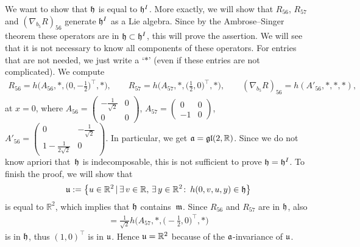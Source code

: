\documentclass[pdftex]{sigma}
\numberwithin{equation}{section}
\newcommand\fh{{\frak h}}
\newcommand\fm{{\frak m}}
\newcommand\fa{{\frak a}}
\newcommand\fu{{\frak u}}
\newcommand{\fgl}{\mathop{{\frak g \frak l}}}
\newcommand\RR{{\mathbb R}}
\begin{document}
We want to show that $\fh$ is equal to $\fh^I$. More exactly, we will show that $R_{56}$, $R_{57}$ and $(\nabla _{b_5}R)_{56}$ generate $\fh^I$ as a Lie algebra. Since by the Ambrose--Singer theorem these operators are in $\fh\subset \fh^I$, this will prove the assertion. We will see that it is not necessary to know all components of these operators. For entries that are not needed, we just write a `$*$' (even if these entries are not complicated). We compute
\begin{gather*}
R_{56}= h\big(A_{56},*,\big( 0,-\tfrac 12\big)^\top\!,* \big), \qquad\!\!
R_{57}= h\big(A_{57},*,\big( \tfrac12,0)^\top\!,* \big) , \qquad\!\!
(\nabla _{b_5}R)_{56}= h(A'_{56},*,*,* ),
\end{gather*}
at $x=0$, where $ A_{56}=\left( \begin{smallmatrix} -\frac1{\sqrt 2}&0\\0&0\end{smallmatrix}\right)$, $ A_{57}=\left( \begin{smallmatrix}0&0\\-1&0\end{smallmatrix}\right)$, $ A'_{56}=\left( \begin{smallmatrix}0& -\frac1{\sqrt 2}\\1-\frac1{2\sqrt 2}&0\end{smallmatrix}\right)$. In particular, we get $\fa=\fgl(2,\RR)$. Since we do not know apriori that~$\fh$ is indecomposable, this is not sufficient to prove $\fh=\fh^I$. To finish the proof, we will show that \begin{gather*}\fu:= \big\{u\in\RR^2 \,|\, \exists\, v\in\RR,\,\exists\, y\in\RR^2\colon\, h(0,v,u,y)\in \fh\big\}\end{gather*} is equal to $\RR^2$, which implies that $\fh$ contains~$\fm$. Since $R_{56}$ and $R_{57}$ are in $\fh$, also
\begin{gather*}[R_{56},R_{57}]= \tfrac 1{\sqrt{2} }h\big(A_{57},*,\big({-} \tfrac12,0\big)^\top,*\big) \end{gather*}
is in $\fh$, thus $(1,0)^\top$ is in $\fu$. Hence $\fu=\RR^2$ because of the $\fa$-invariance of $\fu$.
\end{document}
